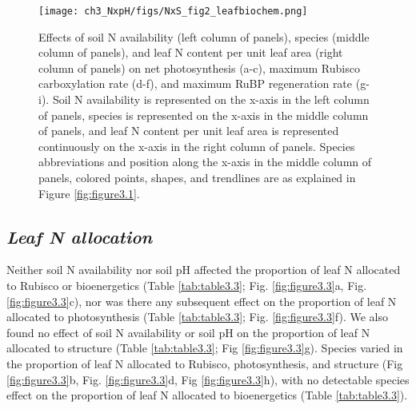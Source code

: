 \newpage
\begin{figure}
    \texttt{[image: ch3\_NxpH/figs/NxS\_fig2\_leafbiochem.png]}
    \centering
    \caption[Effects of soil N availability, species, and leaf N content leaf biochemistry]{Effects of soil N availability (left column of panels), species (middle column of panels), and leaf N content per unit leaf area (right column of panels) on net photosynthesis (a-c), maximum Rubisco carboxylation rate (d-f), and maximum RuBP regeneration rate (g-i). Soil N availability is represented on the x-axis in the left column of panels, species is represented on the x-axis in the middle column of panels, and leaf N content per unit leaf area is represented continuously on the x-axis in the right column of panels. Species abbreviations and position along the x-axis in the middle column of panels, colored points, shapes, and trendlines are as explained in Figure \ref{fig:figure3.1}.}
    \label{fig:figure3.2}
\end{figure}
\clearpage

\newpage
\subsection{\textit{Leaf N allocation}}
Neither soil N availability nor soil pH affected the proportion of leaf N allocated to Rubisco or bioenergetics (Table \ref{tab:table3.3}; Fig. \ref{fig:figure3.3}a, Fig. \ref{fig:figure3.3}c), nor was there any subsequent effect on the proportion of leaf N allocated to photosynthesis (Table \ref{tab:table3.3}; Fig. \ref{fig:figure3.3}f). We also found no effect of soil N availability or soil pH on the proportion of leaf N allocated to structure (Table \ref{tab:table3.3}; Fig \ref{fig:figure3.3}g). Species varied in the proportion of leaf N allocated to Rubisco, photosynthesis, and structure (Fig \ref{fig:figure3.3}b, Fig. \ref{fig:figure3.3}d, Fig \ref{fig:figure3.3}h), with no detectable species effect on the proportion of leaf N allocated to bioenergetics (Table \ref{tab:table3.3}).
\clearpage


